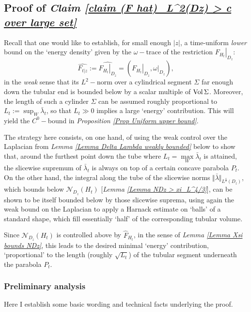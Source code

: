 \documentclass{article}
\newcommand{\func}[1]{\textnormal {#1\,}}
\newcommand{\bl}{\bar\lambda}
\newcommand{\vol}{\func{Vol}}
\begin{document}
\subsection{Proof of \emph{Claim \ref{claim (F hat)_L^2(Dz) > c  over large set}}}
\label{Sec proof of conjecture}



Recall that one would like to
establish, for  small enough $\left\vert z\right\vert $, a time-uniform \emph{lower} bound on the `energy density' given by the $\omega-$trace of the restriction  $\left.F_{H_t}\right\vert _{D_{z}}$:
\begin{displaymath}
\widehat{F_{t\vert z}} := \widehat{\left.F_{H_t}\right\vert_{D_z}} = \left( \left.F_{H_t}\right\vert_{D_z} , \left.\omega \right\vert_{D_z}\right),
\end{displaymath}
 in the \emph{weak} sense that its $L^2-$norm over a cylindrical segment $\Sigma$ far enough down the tubular end is bounded below by a scalar multiple of $\vol \Sigma$. Moreover, the length of such a cylinder $\Sigma$ can be assumed roughly proportional to $L_{t}:=\sup_{W}\bl_{t}$, so that $L_t\gg0$ implies a large `energy' contribution. This  will yield the $C^0-$bound in \emph{Proposition \ref{Prop Uniform upper bound}}.

The strategy here consists, on one hand, of using the weak control over the Laplacian from \emph{Lemma \ref{Lemma Delta Lambda weakly bounded}} below to show that, around the furthest point down the tube where $L_{t}=\max\limits_W \bl_t$ is attained, the slicewise supremum of $\bl_{t}$ is always on top of a certain concave parabola $P_t$. 
On the other hand, the integral along the tube of the slicewise norms $\Vert \bl\Vert_{L^\frac{4}{3}(D_z)}$, which bounds below $\mathcal{N}_{D_z}(H_t)$ [\emph{Lemma \ref{Lemma NDz > xi_L^4/3}}], can be shown to be itself bounded below by those slicewise suprema, using again the weak bound on the Laplacian to apply a Harnack estimate on `balls' of a standard shape, which fill essentially `half' of the corresponding tubular volume. 

Since $\mathcal{N}_{D_z}(H_t)$ is controlled above by $\hat F_{H_t}$, in the sense of \emph{Lemma \ref{Lemma Xsi bounds NDz}}, this leads to the desired minimal `energy' contribution, `proportional' to the length (roughly $\sqrt{L_t}$) of the tubular segment underneath the parabola $P_t$.

\subsubsection{Preliminary analysis}
\label{subsubsec analytical lemmas}
Here I establish some basic wording and technical facts underlying the proof.
  
\end{document}
